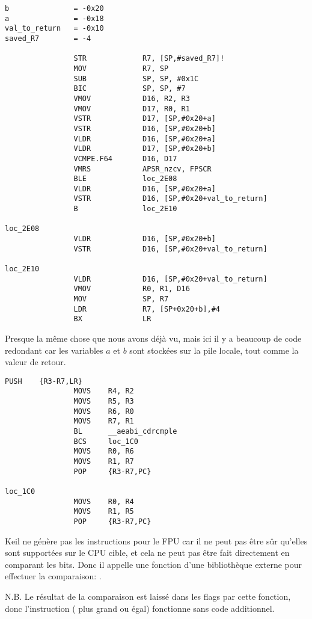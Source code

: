 \myparagraph{\NonOptimizingXcodeIV (\ARMMode)}

\begin{lstlisting}[caption=\NonOptimizingXcodeIV (\ARMMode),style=customasmARM]
b               = -0x20
a               = -0x18
val_to_return   = -0x10
saved_R7        = -4

                STR             R7, [SP,#saved_R7]!
                MOV             R7, SP
                SUB             SP, SP, #0x1C
                BIC             SP, SP, #7
                VMOV            D16, R2, R3
                VMOV            D17, R0, R1
                VSTR            D17, [SP,#0x20+a]
                VSTR            D16, [SP,#0x20+b]
                VLDR            D16, [SP,#0x20+a]
                VLDR            D17, [SP,#0x20+b]
                VCMPE.F64       D16, D17
                VMRS            APSR_nzcv, FPSCR
                BLE             loc_2E08
                VLDR            D16, [SP,#0x20+a]
                VSTR            D16, [SP,#0x20+val_to_return]
                B               loc_2E10

loc_2E08
                VLDR            D16, [SP,#0x20+b]
                VSTR            D16, [SP,#0x20+val_to_return]

loc_2E10
                VLDR            D16, [SP,#0x20+val_to_return]
                VMOV            R0, R1, D16
                MOV             SP, R7
                LDR             R7, [SP+0x20+b],#4
                BX              LR
\end{lstlisting}

Presque la même chose que nous avons déjà vu, mais ici il y a beaucoup de code redondant
car les variables $a$ et $b$ sont stockées sur la pile locale, tout comme la valeur
de retour.

\myparagraph{\OptimizingKeilVI (\ThumbMode)}

\begin{lstlisting}[caption=\OptimizingKeilVI (\ThumbMode),style=customasmARM]
                PUSH    {R3-R7,LR}
                MOVS    R4, R2
                MOVS    R5, R3
                MOVS    R6, R0
                MOVS    R7, R1
                BL      __aeabi_cdrcmple
                BCS     loc_1C0
                MOVS    R0, R6
                MOVS    R1, R7
                POP     {R3-R7,PC}

loc_1C0
                MOVS    R0, R4
                MOVS    R1, R5
                POP     {R3-R7,PC}
\end{lstlisting}


Keil ne génère pas les instructions pour le FPU car il ne peut pas être sûr qu'elles
sont supportées sur le CPU cible, et cela ne peut pas être fait directement en comparant
les bits.
Donc il appelle une fonction d'une bibliothèque externe pour effectuer la comparaison:
.

N.B. Le résultat de la comparaison est laissé dans les flags par cette fonction,
donc l'instruction  ( plus grand ou
égal) fonctionne sans code additionnel.
